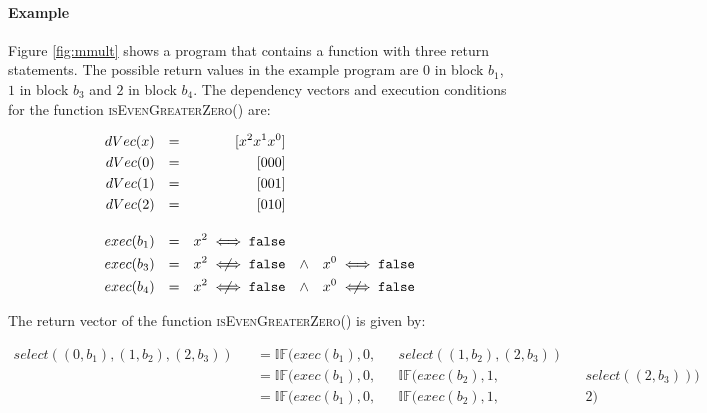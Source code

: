 \paragraph{Example}
Figure \ref{fig:mmult} shows a program that contains a function with three return statements. The possible return values in the example program are $0$ in block $b_1$, $1$ in block $b_3$ and $2$ in block $b_4$. The dependency vectors and execution conditions for the function \textsc{isEvenGreaterZero()} are:

\begin{align*}
    dVec(x) &&= && [x^2 x^1 x^0] \\
    dVec(0) &&= && [000] \\
    dVec(1) &&= && [001] \\
    dVec(2) &&= && [010] \\[1em]
    exec(b_1) &&= && x^2 \iff \mathtt{false} \\
    exec(b_3) &&= && x^2 \centernot\iff \mathtt{false} &&\land && x^0 \iff \mathtt{false} \\
    exec(b_4) &&= && x^2 \centernot\iff \mathtt{false} &&\land && x^0 \centernot\iff \mathtt{false}
\end{align*}

The return vector of the function \textsc{isEvenGreaterZero()} is given by:

\begin{align*}
    select({(0, b_1), (1, b_2), (2, b_3)}) && = \mathbb{IF}(exec(b_1), 0, && select({(1, b_2), (2, b_3)}) && \\
     && = \mathbb{IF}(exec(b_1), 0, && \mathbb{IF}(exec(b_2), 1, && select({(2, b_3)})) \\
      && = \mathbb{IF}(exec(b_1), 0, && \mathbb{IF}(exec(b_2), 1, && 2) \\
\end{align*}


